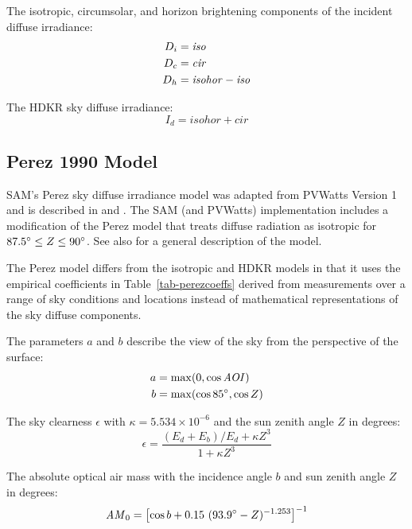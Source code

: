 \documentclass[12pt,letterpaper]{article}
\newcommand\AOI{\ensuremath{\mathit{AOI}}}
\begin{document}
The isotropic, circumsolar, and horizon brightening components of the incident diffuse irradiance:
\begin{align}
D_i &= \mathit{iso} \notag\\
D_c &= \mathit{cir} \notag\\
D_h &= \mathit{isohor} - \mathit{iso}
\end{align}

The HDKR sky diffuse irradiance:
\begin{equation}
I_d = \mathit{isohor} + \mathit{cir}
\end{equation}

\subsection{Perez 1990 Model}\label{sec-perez}

SAM's Perez sky diffuse irradiance model was adapted from PVWatts Version 1 \citep{dobos2013a} and is described in \citet{perez1988} and \citep{perez1990}. The SAM (and PVWatts) implementation includes a modification of the Perez model that treats diffuse radiation as isotropic for $87.5\degree \leq Z \leq 90\degree$. See also \citep{pvmcperez} for a general description of the model.

The Perez model differs from the isotropic and HDKR models in that it uses the empirical  coefficients in Table~\ref{tab-perezcoeffs} derived from measurements over a range of sky conditions and locations instead of mathematical representations of the sky diffuse components.

The parameters $a$ and $b$ describe the view of the sky from the perspective of the surface:
\begin{align}
a &= \max( 0, \cos \AOI ) \notag\\
b & =\max( \cos85\degree, \cos Z) 
\end{align}

The sky clearness $\epsilon$ with $\kappa=5.534\times10^{-6}$ and the sun zenith angle
 $Z$ in degrees:
\begin{equation}\label{eqn-perezepsilon}
\epsilon =\frac{(E_d + E_b ) / E_d + \kappa Z^{3} }{1 +  \kappa Z^{3}}
\end{equation}

The absolute optical air mass with the incidence angle $b$ and sun zenith angle $Z$ in degrees:
\begin{equation}\label{eqn-perezam}
\mathit{AM}_0 = \left[ \cos b + 0.15~( 93.9\degree - Z )^{-1.253} \right]^{-1}
\end{equation}
\end{document}
